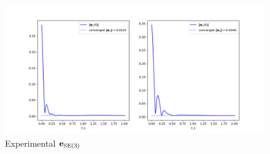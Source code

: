 \begin{figure}[H]
    \centering
    \includegraphics[scale=0.52]{figs/errors_history.png}
    \caption{Experimental $\mathbf{e}_{\text{SE}(3)}$}
    \label{fig:errors_plot}
\end{figure}

